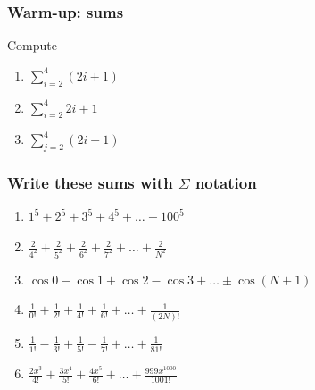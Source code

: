 \documentclass[14pt]{beamer}
\date{}
\title{}
\author{}
\begin{document}





	\begin{frame}[t]
		\frametitle{Warm-up: sums}

		Compute

		\begin{enumerate}
			\item $\displaystyle \sum_{i=2}^{4}(2i+1)$
				\vfill

			\item $\displaystyle \sum_{i=2}^{4}2i + 1$
				\vfill

			\item $\displaystyle \sum_{j=2}^{4}(2i + 1)$
				\vfill
		\end{enumerate}
	\end{frame}

	\begin{frame}[t]
		\fontsize{13}{13}\selectfont
		\frametitle{Write these sums with $\Sigma$ notation}

		\begin{enumerate}
			\item $\displaystyle 1^{5}+ 2^{5}+ 3^{5}+ 4^{5}+ \ldots + 100^{5}$
				\vfill

			\item $\displaystyle \frac{2}{4^{2}}+ \frac{2}{5^{2}}+ \frac{2}{6^{2}}+ \frac{2}{7^{2}}
				+ \ldots + \frac{2}{N^{2}}$
				\vfill

			\item $\displaystyle \cos 0 - \cos 1 + \cos 2 - \cos 3 + %
				\ldots \pm \cos (N+1)$
				\vfill

			\item $\displaystyle \frac{1}{0!}+ \frac{1}{2!}+ \frac{1}{4!}+ \frac{1}{6!}
				+ \ldots + \frac{1}{(2N)!}$
				\vfill

			\item $\displaystyle \frac{1}{1!}- \frac{1}{3!}+ \frac{1}{5!}- \frac{1}{7!}
				+ \ldots + \frac{1}{81!}$
				\vfill

			\item $\displaystyle \frac{2x^{3}}{ 4!}+ \frac{3x^{4}}{5!}+ \frac{4x^{5}}{6!}
				+ \ldots + \frac{999x^{1000}}{1001!}$
		\end{enumerate}
	\end{frame}
\end{document}
